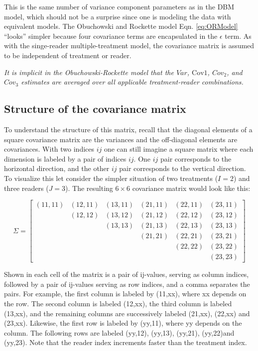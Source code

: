 \documentclass[
]{book}
\begin{document}
This is the same number of variance component parameters as in the DBM model, which should not be a surprise since one is modeling the data with equivalent models. The Obuchowski and Rockette model Eqn. \eqref{eq:ORModel} ``looks'' simpler because four covariance terms are encapsulated in the \(\epsilon\) term. As with the singe-reader multiple-treatment model, the covariance matrix is assumed to be independent of treatment or reader.

\emph{It is implicit in the Obuchowski-Rockette model that the \(Var\), \(\text{Cov1}\), \(Cov_2\), and \(Cov_3\) estimates are averaged over all applicable treatment-reader combinations.}

\hypertarget{StrCovMatrix}{%
\subsection{Structure of the covariance matrix}\label{StrCovMatrix}}

To understand the structure of this matrix, recall that the diagonal elements of a square covariance matrix are the variances and the off-diagonal elements are covariances. With two indices \(ij\) one can still imagine a square matrix where each dimension is labeled by a pair of indices \(ij\). One \(ij\) pair corresponds to the horizontal direction, and the other \(ij\) pair corresponds to the vertical direction. To visualize this let consider the simpler situation of two treatments (\(I = 2\)) and three readers (\(J = 3\)). The resulting \(6 \times 6\) covariance matrix would look like this:

\[
\Sigma=
\begin{bmatrix}
(11,11) & (12,11) & (13,11) & (21,11) & (22,11) & (23,11) \\
& (12,12) & (13,12) & (21,12) & (22,12) & (23,12) \\ 
& & (13,13) & (21,13) & (22,13) & (23,13) \\ 
& & & (21,21) & (22,21) & (23,21) \\
& & & & (22,22) & (23,22) \\ 
& & & & & (23,23)
\end{bmatrix}
\]

Shown in each cell of the matrix is a pair of ij-values, serving as column indices, followed by a pair of ij-values serving as row indices, and a comma separates the pairs. For example, the first column is labeled by (11,xx), where xx depends on the row. The second column is labeled (12,xx), the third column is labeled (13,xx), and the remaining columns are successively labeled (21,xx), (22,xx) and (23,xx). Likewise, the first row is labeled by (yy,11), where yy depends on the column. The following rows are labeled (yy,12), (yy,13), (yy,21), (yy,22)and (yy,23). Note that the reader index increments faster than the treatment index.
\end{document}
